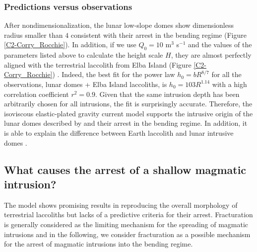 \subsubsection*{Predictions versus observations}

After   nondimensionalization,   the   lunar  low-slope   domes   show
dimensionless radius smaller than $4$  consistent with their arrest in
the bending regime (Figure \ref{C2-Corry_Rocchie}). In addition, if we
use $Q_0=10$  m$^3$ s$^{-1}$ and  the values of the  parameters listed
above to  calculate the  height scale $H$,  they are  almost perfectly
aligned  with  the  terrestrial  laccolith from  Elba  Island  (Figure
\ref{C2-Corry_Rocchie}) \citep{Michaut:2011kg}.  Indeed,  the best fit
for the power law $h_0=bR^{8/7}$ for all the observations, lunar domes
+  Elba  Island  laccoliths,  is  $h_0  =  103R^{1.14}$  with  a  high
correlation coefficient $r^2=0.9$. Given that the same intrusion depth
has  been   arbitrarily  chosen  for   all  intrusions,  the   fit  is
surprisingly  accurate.   Therefore,   the  isoviscous  elastic-plated
gravity current model supports the intrusive origin of the lunar domes
described  by \citet{Wohler:2009jj}  and their  arrest in  the bending
regime.  In  addition, it  is able to  explain the  difference between
Earth laccolith and lunar intrusive domes \citep{Michaut:2011kg}.

\subsection{What causes the arrest of a shallow magmatic intrusion?}

The  model   shows  promising  results  in   reproducing  the  overall
morphology  of  terrestrial  laccoliths  but  lacks  of  a  predictive
criteria for  their arrest.   Fracturation is generally  considered as
the limiting mechanism for the spreading of magmatic intrusions and in
the following,  we consider fracturation  as a possible  mechanism for
the arrest of magmatic intrusions into the bending regime.

